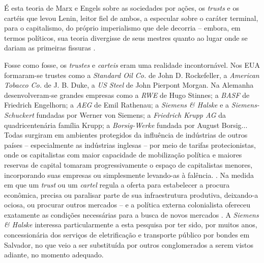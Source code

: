 É esta teoria de Marx e Engels sobre as sociedades por ações, os \textit{trusts} e os cartéis que levou Lenin, leitor fiel de ambos, a especular sobre o caráter terminal, para o capitalismo, do próprio imperialismo que dele decorria -- embora, em termos políticos, sua teoria divergisse de seus mestres quanto ao lugar onde se dariam as primeiras fissuras \cite{lenin_imperialismo_1987}.

Fosse como fosse, os \textit{trustes} e \textit{carteis} eram uma realidade incontornável. Nos EUA formaram-se trustes como a \textit{Standard Oil Co.} de John D. Rockefeller, a \textit{American Tobacco Co.} de J. B. Duke, a \textit{US Steel} de John Pierpont Morgan. Na Alemanha desenvolveram-se grandes empresas como a \textit{RWE} de Hugo Stinnes; a \textit{BASF} de Friedrich Engelhorn; a \textit{AEG} de Emil Rathenau; a \textit{Siemens \& Halske} e a \textit{Siemens-Schuckert} fundadas por Werner von Siemens; a \textit{Friedrich Krupp AG} da quadricentenária família Krupp; a \textit{Borsig-Werke} fundada por August Borsig...  Todas surgiram em ambientes protegidos da influência de indústrias de outros países -- especialmente as indústrias inglesas -- por meio de tarifas protecionistas, onde os capitalistas com maior capacidade de mobilização política e maiores reservas de capital tomaram progressivamente o espaço de capitalistas menores, incorporando suas empresas ou simplesmente levando-as à falência.  \cite{bukharin_imperialismo_1986,huberman_historia_1986}.  Na medida em que um \textit{trust} ou um \textit{cartel} regula a oferta para estabelecer a procura econômica, precisa ou paralisar parte de sua infraestrutura produtiva, deixando-a ociosa, ou procurar outros mercados -- e a política externa colonialista ofereceu exatamente as condições necessárias para a busca de novos mercados \cite{lenin_imperialismo_1987}. A \textit{Siemens \& Halske} interessa particularmente a esta pesquisa por ter sido, por muitos anos, concessionária dos serviços de eletrificação e transporte público por bondes em Salvador, no que veio a ser substituída por outros conglomerados a serem vistos adiante, no momento adequado.

